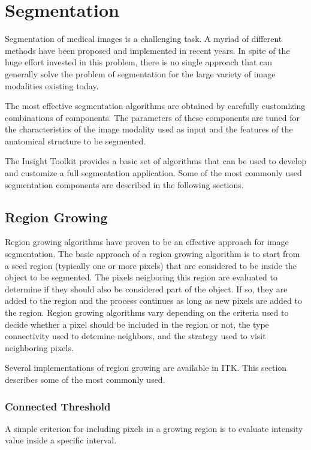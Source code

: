 
\chapter{Segmentation}

Segmentation of medical images is a challenging task. A myriad of different
methods have been proposed and implemented in recent years. In spite of the
huge effort invested in this problem, there is no single approach that can
generally solve the problem of segmentation for the large variety of image
modalities existing today.

The most effective segmentation algorithms are obtained by carefully
customizing combinations of components. The parameters of these components are
tuned for the characteristics of the image modality used as input and the
features of the anatomical structure to be segmented. 

The Insight Toolkit provides a basic set of algorithms that can be used to
develop and customize a full segmentation application. Some of the most
commonly used segmentation components are described in the following
sections.


\section{Region Growing}

Region growing algorithms have proven to be an effective approach for image
segmentation. The basic approach of a region growing algorithm is to start
from a seed region (typically one or more pixels) that are considered to be
inside the object to be segmented. The pixels neigboring this region are
evaluated to determine if they should also be considered part of the
object. If so, they are added to the region and the process continues as long
as new pixels are added to the region.  Region growing algorithms vary
depending on the criteria used to decide whether a pixel should be included
in the region or not, the type connectivity used to detemine neighbors, and
the strategy used to visit neighboring pixels.

Several implementations of region growing are available in ITK.  This section
describes some of the most commonly used.

\subsection{Connected Threshold}

A simple criterion for including pixels in a growing region is to evaluate
intensity value inside a specific interval.

